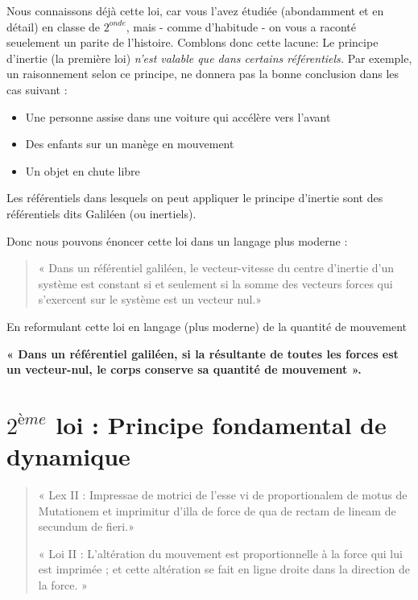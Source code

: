 \documentclass[11pt,a4paper]{article}
\begin{document}
Nous connaissons déjà cette loi, car vous l'avez étudiée (abondamment et en détail) en classe de $2^{onde}$, mais - comme d'habitude - on vous a raconté seuelement un parite de l'histoire. Comblons donc cette lacune: Le principe d’inertie (la première loi) \textit{n’est valable que dans certains référentiels.} Par exemple, un raisonnement selon ce principe, ne donnera pas la bonne conclusion dans les cas suivant :
\begin{itemize}
    \item Une personne assise dans une voiture qui accélère vers l’avant
    \item Des enfants sur un manège en mouvement
    \item Un objet en chute libre
\end{itemize}

Les référentiels dans lesquels on peut appliquer le principe d’inertie sont des référentiels dits Galiléen (ou inertiels).  

Donc nous pouvons énoncer cette loi dans un langage plus moderne : 
\begin{quote}
« Dans un référentiel galiléen, le vecteur-vitesse du centre d'inertie d'un système est constant si et seulement si la somme des vecteurs forces qui s'exercent sur le système est un vecteur nul.»
\end{quote}

En reformulant cette loi en langage (plus moderne) de la quantité de mouvement 

\begin{shaded}
\textbf{« Dans un référentiel galiléen, si la résultante de toutes les forces est un vecteur-nul, le corps conserve sa quantité de mouvement ». }
\end{shaded}

\section{$2^{ème}$ loi : Principe fondamental de dynamique}%

\begin{quote}
    \centering
    \small{« Lex II : Impressae de motrici de l'esse vi de proportionalem de motus de Mutationem et imprimitur d'illa de force de qua de rectam de lineam de secundum de fieri.»}
    
    \small{« Loi II : L'altération du mouvement est proportionnelle à la force qui lui est imprimée ; et cette altération se fait en ligne droite dans la direction de la force. »}
\end{quote}
\end{document}
